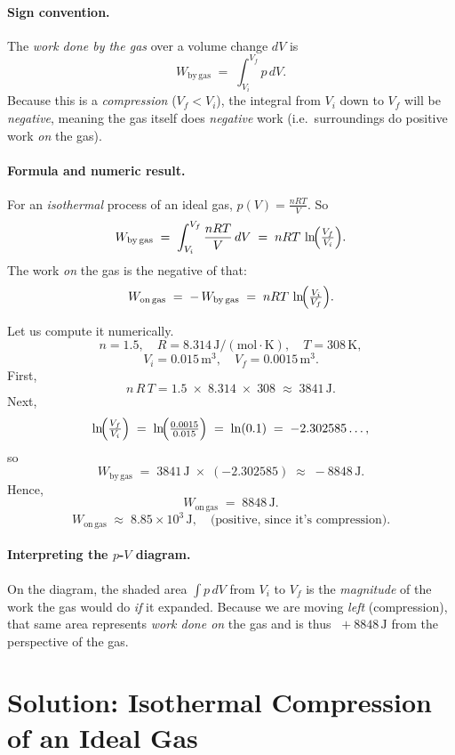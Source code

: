 \documentclass[12pt]{article}
\theoremstyle{definition} %
\theoremstyle{plain} %
\begin{document}
\paragraph{Sign convention.}
The \emph{work done by the gas} over a volume change $dV$ is 
\[
W_{\mathrm{by\,gas}}
\;=\;
\int_{V_i}^{V_f} p\,dV.
\]
Because this is a \emph{compression} ($V_f < V_i$), the integral from $V_i$ down to $V_f$ will be \emph{negative}, meaning the gas itself does \emph{negative} work (i.e.\ surroundings do positive work \emph{on} the gas).

\paragraph{Formula and numeric result.}
For an \emph{isothermal} process of an ideal gas, $p(V)=\tfrac{nRT}{V}$.  So
\[
W_{\mathrm{by\,gas}}
\;=\;
\int_{V_i}^{V_f} \frac{nRT}{V}\,dV
\;=\;
nRT\,\ln\!\Bigl(\tfrac{V_f}{V_i}\Bigr).
\]
The work \emph{on} the gas is the negative of that:
\[
W_{\mathrm{on\,gas}}
\;=\;
-\,W_{\mathrm{by\,gas}}
\;=\;
nRT\,\ln\!\Bigl(\tfrac{V_i}{V_f}\Bigr).
\]

\noindent
Let us compute it numerically. 
\[
n=1.5,\quad R=8.314\,\mathrm{J/(mol\cdot K)},\quad T=308\,\mathrm{K},
\]
\[
V_i=0.015\,\mathrm{m^3}, 
\quad 
V_f=0.0015\,\mathrm{m^3}.
\]
First,
\[
n\,R\,T
= 1.5 \;\times\; 8.314 \;\times\; 308 
\;\approx\; 3841\,\mathrm{J}.
\]
Next,
\[
\ln\!\Bigl(\tfrac{V_f}{V_i}\Bigr)
\;=\;
\ln\!\Bigl(\tfrac{0.0015}{0.015}\Bigr)
\;=\;
\ln(0.1)
\;=\;
-2.302585\ldots,
\]
so
\[
W_{\mathrm{by\,gas}}
\;=\;
3841\,\mathrm{J}
\;\times\;
(-2.302585)
\;\approx\;
-8848\,\mathrm{J}.
\]
Hence,
\[
W_{\mathrm{on\,gas}}
\;=\;
8848\,\mathrm{J}.
\]
\[
\boxed{
W_{\mathrm{on\,gas}}
\;\approx\;
8.85\times 10^3\,\mathrm{J},
\quad
\text{(positive, since it's compression).}
}
\]

\paragraph{Interpreting the $p$-$V$ diagram.}
On the diagram, the shaded area \(\int p\,dV\) from $V_i$ to $V_f$ is the \emph{magnitude} of the work the gas would do \emph{if} it expanded.  
Because we are moving \emph{left} (compression), that same area represents \emph{work done on} the gas and is thus \(\;+\!8848\,\mathrm{J}\) from the perspective of the gas.


\section*{Solution: Isothermal Compression of an Ideal Gas}
\end{document}
